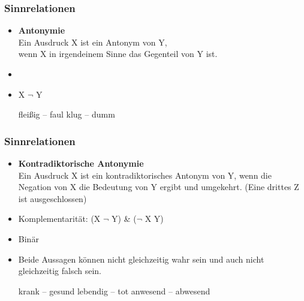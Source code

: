 \begin{frame}
\frametitle{Sinnrelationen}

\begin{itemize}
	\item \textbf{Antonymie}\\
          Ein Ausdruck X ist ein Antonym von Y,\\
          wenn X in irgendeinem Sinne das Gegenteil von Y ist.
	\item[]	
	\item X \ras $\lnot$ Y
	
	\eal 
		\ex fleißig -- faul
		\ex klug -- dumm
	\zl
	
\end{itemize}

\end{frame}



\begin{frame}
\frametitle{Sinnrelationen}

\begin{itemize}
	\item \textbf{Kontradiktorische Antonymie}\\
Ein Ausdruck X ist ein kontradiktorisches Antonym von Y, wenn die Negation von X die Bedeutung von Y ergibt und umgekehrt. (Eine drittes Z ist ausgeschlossen)
	\item Komplementarität: (X \ras $\lnot$ Y) \& ($\lnot$ X  \ras Y)
	\item Binär
	\item Beide Aussagen können nicht gleichzeitig wahr sein und auch nicht gleichzeitig falsch sein.
	
	\eal
		\ex krank -- gesund
		\ex lebendig -- tot
		\ex anwesend -- abwesend
	\zl
	
\end{itemize}

\end{frame}



